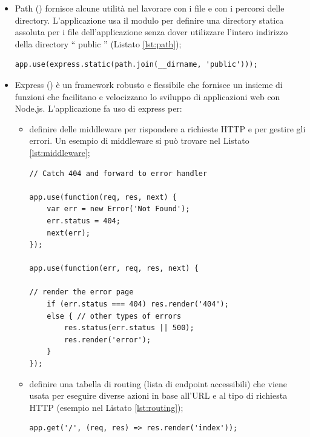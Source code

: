 \documentclass[12pt]{report}
\begin{document}
\begin{itemize}
	\item Path (\cite{path}) fornisce alcune utilità nel lavorare con i file e con i percorsi delle directory. L'applicazione usa il modulo per definire una directory statica assoluta per i file dell'applicazione senza dover utilizzare l'intero indirizzo della directory \textquotedblleft{} public \textquotedblright{} (Listato \ref{lst:path});
\begin{lstlisting}[caption={Uso del modulo \emph{path}.}, label={lst:path}, xleftmargin=\dimexpr-\leftmargini]
app.use(express.static(path.join(__dirname, 'public')));
\end{lstlisting}

	\item Express (\cite{express}) è un framework robusto e flessibile che fornisce un insieme di funzioni che facilitano e velocizzano lo sviluppo di applicazioni web con Node.js. L'applicazione fa uso di express per:
	\begin{itemize}
		\item definire delle middleware per rispondere a richieste HTTP e per gestire gli errori. Un esempio di middleware si può trovare nel Listato \ref{lst:middleware}; 
\begin{lstlisting}[caption={Middleware per caricare la pagina \textquotedblleft{} 404.ejs \textquotedblright{} nel caso in cui un utente provi ad accedere ad una pagina non esistente}, label={lst:middleware}, xleftmargin=\dimexpr-\leftmarginii-\leftmargini]
// Catch 404 and forward to error handler

app.use(function(req, res, next) {
	var err = new Error('Not Found');
	err.status = 404;
	next(err);
});
	
app.use(function(err, req, res, next) {

// render the error page
	if (err.status === 404) res.render('404');
	else { // other types of errors
		res.status(err.status || 500);
		res.render('error');
	}
});
\end{lstlisting}

		\item definire una tabella di routing (lista di endpoint accessibili) che viene usata per eseguire diverse azioni in base all'URL e al tipo di richiesta HTTP (esempio nel Listato \ref{lst:routing});
\begin{lstlisting}[caption={Implementazione di un endpoint. Quando viene fatta una richiesta GET all'endpoint \emph{\textquotedblleft{} / \textquotedblright{}} allora, come risposta, l'applicazione invia all'utente un file chiamato \textquotedblleft{} index.ejs \textquotedblright{} (che rappresenta la homepage) che viene poi caricato dal suo browser}, label={lst:routing}, xleftmargin=\dimexpr-\leftmarginii-\leftmargini]
app.get('/', (req, res) => res.render('index'));
\end{lstlisting}


\end{itemize}
\end{itemize}
\end{document}
